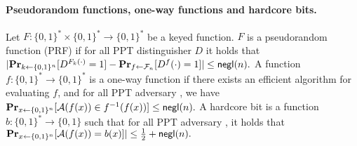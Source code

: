 \paragraph{Pseudorandom functions, one-way functions and hardcore bits.}
%
Let $F : \{0, 1\}^\ast \times \{0, 1\}^\ast \rightarrow \{0, 1\}^\ast$ be a keyed function.
%
$F$ is a pseudorandom function (PRF) if for all PPT distinguisher $D$ it holds that
%
\( | \mathbf{Pr}_{k \gets \{0, 1\}^n}[D^{F_k(\cdot)} = 1] - \mathbf{Pr}_{f \gets \mathcal{F}_n}[D^{f}(\cdot) = 1] | \le \mathsf{negl}(n). \)
%
A function $f : \{0, 1\}^* \rightarrow \{0, 1\}^*$ is a one-way function if there exists an efficient algorithm for evaluating $f$, and for all PPT adversary \adv, we have
%
\( \mathbf{Pr}_{x \gets \{0, 1\}^n}[\mathcal{A}(f(x)) \in f^{-1}(f(x))] \le \mathsf{negl}(n). \)
%
A hardcore bit is a function $b : \{0, 1\}^\ast \rightarrow \{0, 1\}$ such that for all PPT adversary \adv, it holds that
%
\( \mathbf{Pr}_{x \gets \{0, 1\}^n}[\mathcal{A}(f(x)) = b(x)]| \le \frac{1}{2} + \mathsf{negl}(n). \)
